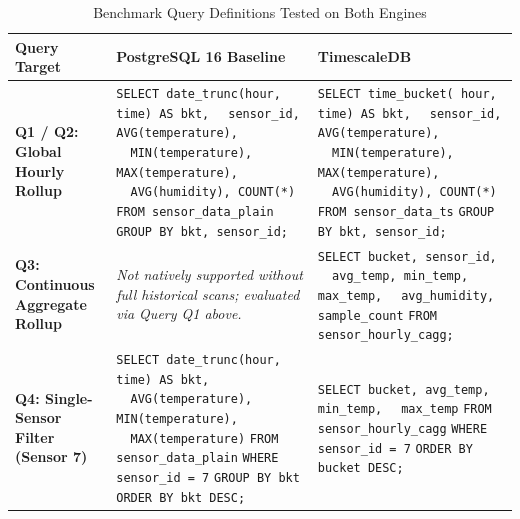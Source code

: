 \documentclass[conference,a4paper]{IEEEtran}
\newcommand{\sq}{\textquotesingle}
\begin{document}
\begin{table}[t]
\caption{Benchmark Query Definitions Tested on Both Engines}
\label{tab:query_definitions}
\centering
\scriptsize
\renewcommand{\arraystretch}{1.2}
\begin{tabularx}{\textwidth}{@{}p{2.6cm}XX@{}}
\toprule
\textbf{Query Target} & \textbf{PostgreSQL 16 Baseline} & \textbf{TimescaleDB} \\ \midrule
\textbf{Q1 / Q2: Global Hourly Rollup} & 
\texttt{SELECT date\_trunc(\sq hour\sq, time) AS bkt,}\newline
\texttt{\ \ sensor\_id, AVG(temperature),}\newline
\texttt{\ \ MIN(temperature), MAX(temperature),}\newline
\texttt{\ \ AVG(humidity), COUNT(*)}\newline
\texttt{FROM sensor\_data\_plain}\newline
\texttt{GROUP BY bkt, sensor\_id;} &
\texttt{SELECT time\_bucket(\sq 1 hour\sq, time) AS bkt,}\newline
\texttt{\ \ sensor\_id, AVG(temperature),}\newline
\texttt{\ \ MIN(temperature), MAX(temperature),}\newline
\texttt{\ \ AVG(humidity), COUNT(*)}\newline
\texttt{FROM sensor\_data\_ts}\newline
\texttt{GROUP BY bkt, sensor\_id;} \\ \addlinespace[0.6ex]
\textbf{Q3: Continuous Aggregate Rollup} & 
\textit{Not natively supported without full historical scans; evaluated via Query Q1 above.} &
\texttt{SELECT bucket, sensor\_id,}\newline
\texttt{\ \ avg\_temp, min\_temp, max\_temp,}\newline
\texttt{\ \ avg\_humidity, sample\_count}\newline
\texttt{FROM sensor\_hourly\_cagg;} \\ \addlinespace[0.6ex]
\textbf{Q4: Single-Sensor Filter (Sensor 7)} & 
\texttt{SELECT date\_trunc(\sq hour\sq, time) AS bkt,}\newline
\texttt{\ \ AVG(temperature), MIN(temperature),}\newline
\texttt{\ \ MAX(temperature)}\newline
\texttt{FROM sensor\_data\_plain}\newline
\texttt{WHERE sensor\_id = 7}\newline
\texttt{GROUP BY bkt ORDER BY bkt DESC;} &
\texttt{SELECT bucket, avg\_temp, min\_temp,}\newline
\texttt{\ \ max\_temp}\newline
\texttt{FROM sensor\_hourly\_cagg}\newline
\texttt{WHERE sensor\_id = 7}\newline
\texttt{ORDER BY bucket DESC;} \\ \bottomrule
\end{tabularx}
\end{table}
\end{document}
